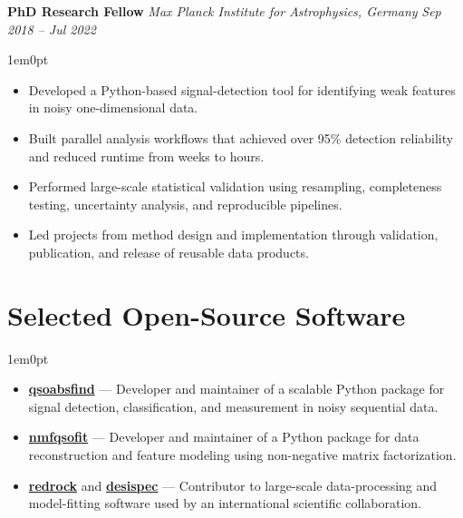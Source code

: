 \documentclass[a4paper,10pt]{article}
\begin{document}
\textcolor{sectionblue}{\textbf{PhD Research Fellow}} \hfill
\textcolor{sectionblue}{\textit{Max Planck Institute for Astrophysics, Germany}} \hfill
\textcolor{sectionblue}{\textit{Sep 2018 -- Jul 2022}}

\vspace{1.5mm}
\begin{adjustwidth}{1em}{0pt}
\begin{itemize}[leftmargin=*, itemsep=2pt]
    \item Developed a Python-based signal-detection tool for identifying weak features in noisy one-dimensional data.
    \item Built parallel analysis workflows that achieved over 95\% detection reliability and reduced runtime from weeks to hours.
    \item Performed large-scale statistical validation using resampling, completeness testing, uncertainty analysis, and reproducible pipelines.
    \item Led projects from method design and implementation through validation, publication, and release of reusable data products.
\end{itemize}
\end{adjustwidth}

\vspace*{-1mm}

\section*{Selected Open-Source Software}
\begin{adjustwidth}{1em}{0pt}
\begin{itemize}[leftmargin=*, itemsep=3pt]
    \item \textbf{\href{https://github.com/abhi0395/qsoabsfind}{qsoabsfind}} --- Developer and maintainer of a scalable Python package for signal detection, classification, and measurement in noisy sequential data.
    \item \textbf{\href{https://github.com/abhi0395/nmfqsofit}{nmfqsofit}} --- Developer and maintainer of a Python package for data reconstruction and feature modeling using non-negative matrix factorization.
    \item \textbf{\href{https://github.com/desihub/redrock}{redrock}} and \textbf{\href{https://github.com/desihub/desispec}{desispec}} --- Contributor to large-scale data-processing and model-fitting software used by an international scientific collaboration.
\end{itemize}
\end{adjustwidth}
\end{document}
